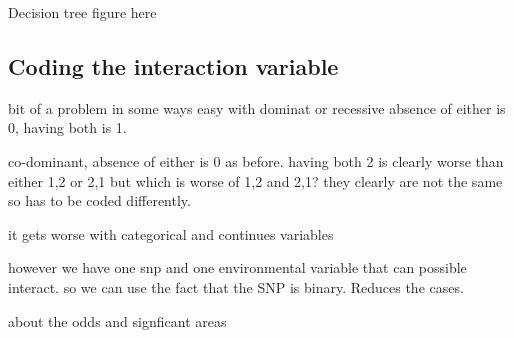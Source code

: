 \documentclass[10pt,a4paper]{report}
\begin{document}
Decision tree figure here

\subsection{Coding the interaction variable}
bit of a problem in some ways
easy with dominat or recessive
absence of either is 0, having both is 1.

co-dominant, absence of either is 0 as before. having both 2 is clearly worse than either 1,2 or 2,1
but which is worse of 1,2 and 2,1? they clearly are not the same so has to be coded differently.

it gets worse with categorical and continues variables

however we have one snp and one environmental variable that can possible interact. so we can use the fact that the SNP is binary. Reduces the cases.

about the odds and signficant areas

\clearpage
\end{document}
